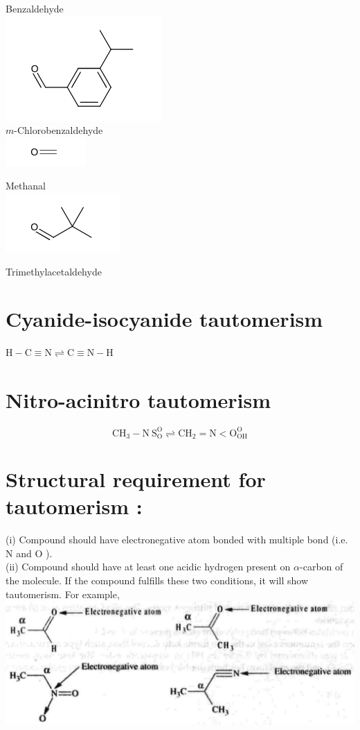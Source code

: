 \documentclass[10pt]{article}
\begin{document}
Benzaldehyde\\
\includegraphics{smile-1c4b1e515f278b50a2260f77772a7a8e1158b4bd}\\
$m$-Chlorobenzaldehyde\\
\includegraphics{smile-03c029266aa6d106d681d243f0620e56a2d33081}

Methanal\\
\includegraphics{smile-7d1fcf56ec09908318e5ae74228ae7ee7d894c92}

Trimethylacetaldehyde

\section*{Cyanide-isocyanide tautomerism}
$\mathrm{H}-\mathrm{C} \equiv \mathrm{N} \rightleftharpoons \mathrm{C} \equiv \mathrm{N}-\mathrm{H}$

\section*{Nitro-acinitro tautomerism}
$$
\mathrm{CH}_{3}-\mathrm{N} \mathrm{~S}_{\mathrm{O}}^{\mathrm{O}} \rightleftharpoons \mathrm{CH}_{2}=\mathrm{N}<\mathrm{O}_{\mathrm{OH}}^{\mathrm{O}}
$$

\section*{Structural requirement for tautomerism :}
(i) Compound should have electronegative atom bonded with multiple bond (i.e. N and O ).\\
(ii) Compound should have at least one acidic hydrogen present on $\alpha$-carbon of the molecule. If the compound fulfills these two conditions, it will show tautomerism. For example,\\
\includegraphics[max width=\textwidth, center]{2025_01_28_8470952b98110cec3aabg-042(1)}
\end{document}
